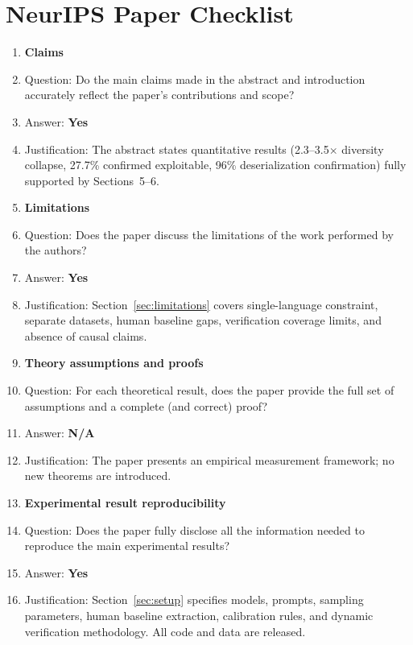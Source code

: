 \documentclass{article}
\providecommand{\answerYes}[1][]{\textbf{Yes}}
\providecommand{\answerNA}[1][]{\textbf{N/A}}
\begin{document}



\newpage
\section*{NeurIPS Paper Checklist}

\begin{enumerate}

\item {\bf Claims}
    \item[] Question: Do the main claims made in the abstract and introduction accurately reflect the paper's contributions and scope?
    \item[] Answer: \answerYes{}
    \item[] Justification: The abstract states quantitative results (2.3--3.5$\times$ diversity collapse, 27.7\% confirmed exploitable, 96\% deserialization confirmation) fully supported by Sections~5--6.

\item {\bf Limitations}
    \item[] Question: Does the paper discuss the limitations of the work performed by the authors?
    \item[] Answer: \answerYes{}
    \item[] Justification: Section~\ref{sec:limitations} covers single-language constraint, separate datasets, human baseline gaps, verification coverage limits, and absence of causal claims.

\item {\bf Theory assumptions and proofs}
    \item[] Question: For each theoretical result, does the paper provide the full set of assumptions and a complete (and correct) proof?
    \item[] Answer: \answerNA{}
    \item[] Justification: The paper presents an empirical measurement framework; no new theorems are introduced.

\item {\bf Experimental result reproducibility}
    \item[] Question: Does the paper fully disclose all the information needed to reproduce the main experimental results?
    \item[] Answer: \answerYes{}
    \item[] Justification: Section~\ref{sec:setup} specifies models, prompts, sampling parameters, human baseline extraction, calibration rules, and dynamic verification methodology. All code and data are released.


\end{enumerate}
\end{document}
